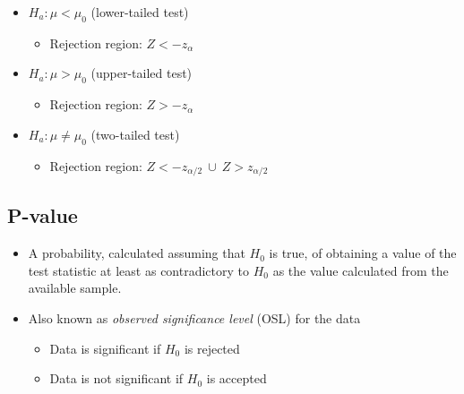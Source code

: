 \documentclass[a4paper]{article}
\begin{document}
\begin{enumerate}
    \begin{itemize}
        \item $H_{a}: \mu < \mu_{0}$ (lower-tailed test)
        \begin{itemize}[label=$\circ$]
            \item Rejection region: $Z < -z_{\alpha}$
        \end{itemize}
        \item $H_{a}: \mu > \mu_{0}$ (upper-tailed test)
        \begin{itemize}[label=$\circ$]
            \item Rejection region: $Z > -z_{\alpha}$
        \end{itemize}
        \item $H_{a}: \mu \neq \mu_{0}$ (two-tailed test)
        \begin{itemize}[label=$\circ$]
            \item Rejection region: $Z < -z_{\alpha/2} \ \cup  \ Z > z_{\alpha/2}$
        \end{itemize}
    \end{itemize}
\end{enumerate}
\subsection{P-value}
\begin{itemize}
    \item A probability, calculated assuming that $H_{0}$ is true, of obtaining a value of the test statistic at least as contradictory to $H_{0}$ as the value calculated from the available sample.
    \item Also known as \textit{observed significance level} (OSL) for the data
    \begin{itemize}[label=$\circ$]
        \item Data is significant if $H_{0}$ is rejected
        \item Data is not significant if $H_{0}$ is accepted
    \end{itemize}
\end{itemize}
\end{document}
